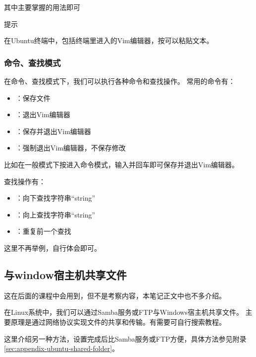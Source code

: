 其中主要掌握的用法即可

\begin{zy}
提示

在Ubuntu终端中，包括终端里进入的Vim编辑器，按可以粘贴文本。
\end{zy}

\subsubsection{命令、查找模式}
在命令、查找模式下，我们可以执行各种命令和查找操作。
常用的命令有：
\begin{itemize}
\item {}：保存文件
\item {}：退出Vim编辑器
\item {}：保存并退出Vim编辑器
\item {}：强制退出Vim编辑器，不保存修改
\end{itemize}

比如在一般模式下按\code{:}进入命令模式，输入并回车即可保存并退出Vim编辑器。

查找操作有：
\begin{itemize}
\item {}：向下查找字符串“string”
\item {}：向上查找字符串“string”
\item {}：重复前一个查找
\end{itemize}

这里不再举例，自行体会即可。


\subsection{与window宿主机共享文件}
这在后面的课程中会用到，但不是考察内容，本笔记正文中也不多介绍。

在Linux系统中，我们可以通过Samba服务或FTP与Windows宿主机共享文件。
主要原理是通过网络协议实现文件的共享和传输。有需要可自行搜索教程。

这里介绍另一种方法，设置完成后比Samba服务或FTP方便，具体方法参见附录\ref{sec:appendix-ubuntu-shared-folder}。
